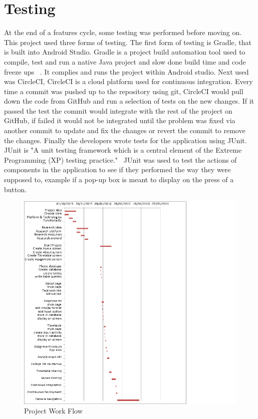 \section{Testing}
At the end of a features cycle, some testing was performed before moving on. This project used three forms of testing. The first form of testing is Gradle, that is built into Android Studio. Gradle is a project build automation tool used to compile, test and run a native Java project and slow done build time and code freeze ups ~\cite{gradle}. It complies and runs the project within Android studio. Next used was CircleCI, CircleCI is a cloud platform used for continuous integration. Every time a commit was pushed up to the repository using git, CircleCI would pull down the code from GitHub and run a selection of tests on the new changes. If it passed the test the commit would integrate with the rest of the project on GitHub, if failed it would not be integrated until the problem was fixed via another commit to update and fix the changes or revert the commit to remove the changes. Finally the developers wrote tests for the application using JUnit. JUnit is "A unit testing framework which is a central element of the Extreme Programming (XP) testing practice."~\cite{junit} JUnit was used to test the actions of components in the application to see if they performed the way they were supposed to, example if a pop-up box is meant to display on the press of a button. 
\begin{figure}
	\includegraphics{img/gannt.png}
	\caption{Project Work Flow}
\end{figure}

